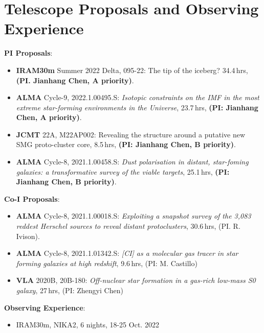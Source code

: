 \documentclass[A4,11pt]{article}
\newenvironment{paperlist}
{ \begin{itemize}[leftmargin=0.8cm, label={$\bullet$}]
    \setlength{\itemsep}{1pt}
    \setlength{\parskip}{1pt}
    \setlength{\parsep}{1pt}     }
{ \end{itemize}                  }
\begin{document}

\section{Telescope Proposals and Observing Experience}
{\bf PI Proposals}:\\
\vspace{-0.8em}
\begin{paperlist}
    \item {\bf IRAM30m} Summer 2022 Delta, 095-22:  The tip of the iceberg? 34.4\,hrs, {\bf (PI. Jianhang Chen, A priority)}.
    \item {\bf ALMA} Cycle-9, 2022.1.00495.S: \emph{Isotopic constraints on the IMF in the most extreme star-forming environments in the Universe}, 23.7\,hrs, {\bf (PI: Jianhang Chen, A priority)}. 
    \item {\bf JCMT} 22A, M22AP002: Revealing the structure around a putative new SMG proto-cluster core, 8.5\,hrs, {\bf (PI: Jianhang Chen, B priority)}.
    \item {\bf ALMA} Cycle-8, 2021.1.00458.S: \emph{Dust polarisation in distant, star-foming galaxies: a transformative survey of the viable targets}, 25.1\,hrs, {\bf (PI: Jianhang Chen, B priority)}. 
\end{paperlist}

{\bf Co-I Proposals}:\\
\vspace{-0.8em}
\begin{paperlist}
    \item {\bf ALMA} Cycle-8, 2021.1.00018.S: \emph{Exploiting a snapshot survey of the 3,083 reddest Herschel sources to reveal distant protoclusters}, 30.6\,hrs, (PI. R. Ivison).
    \item {\bf ALMA} Cycle-8, 2021.1.01342.S: \emph{[CI] as a molecular gas tracer in star forming galaxies at high redshift}, 9.6\,hrs, (PI: M. Castillo)
    \item {\bf VLA} 2020B, 20B-180: \emph{Off-nuclear star formation in a gas-rich low-mass S0 galaxy}, 27\,hrs, (PI: Zhengyi Chen)
\end{paperlist}

{\bf Observing Experience}:\\
\vspace{-0.8em}
\begin{paperlist}
    \item IRAM30m, NIKA2, 6 nights, 18-25 Oct. 2022
\end{paperlist}
\end{document}
